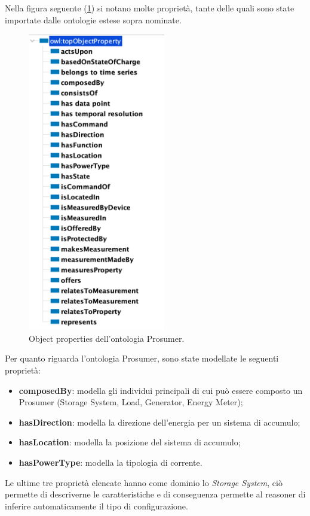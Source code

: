 Nella figura seguente (\ref*{fig:proprieta_prosumer}) si notano molte proprietà, tante delle quali sono state importate dalle ontologie estese sopra nominate.
\begin{figure}[!ht]
    \centering
    \includegraphics[width=6cm]{images/proprieta_prosumer.png}
    \caption{Object properties dell'ontologia Prosumer.}
    \label{fig:proprieta_prosumer}
\end{figure}

Per quanto riguarda l'ontologia Prosumer, sono state modellate le seguenti proprietà:
\begin{itemize}
    \item \textbf{composedBy}: modella gli individui principali di cui può essere composto un Prosumer (Storage System, Load, Generator, Energy Meter);
    \item \textbf{hasDirection}: modella la direzione dell'energia per un sistema di accumulo;
    \item \textbf{hasLocation}: modella la posizione del sistema di accumulo;
    \item \textbf{hasPowerType}: modella la tipologia di corrente.
\end{itemize}

Le ultime tre proprietà elencate hanno come dominio lo \textit{Storage System}, ciò permette di descriverne le caratteristiche e di conseguenza permette al reasoner di inferire automaticamente il tipo di configurazione.

